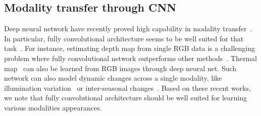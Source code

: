 \subsection{Modality transfer through CNN}\label{se:soa_CNN}
Deep neural network have recently proved high capability in modality transfer~\cite{Kuznietsov2017,Godard2017,xu2017learning}. In particular, fully convolutional architecture seems to be well suited for that task~\cite{Badrinarayanan2017}. For instance, estimating depth map from single RGB data is a challenging problem where fully convolutional network outperforms other methods~\cite{Kuznietsov2017,Godard2017}. Thermal map~\cite{xu2017learning} can also be learned from RGB images through deep neural net. Such network can also model dynamic changes across a single modality, like illumination variation~\cite{Yin2017} or inter-seasonal changes~\cite{zhu2017unpaired}. Based on these recent works, we note that fully convolutional architecture should be well suited for learning various modalities appearances.